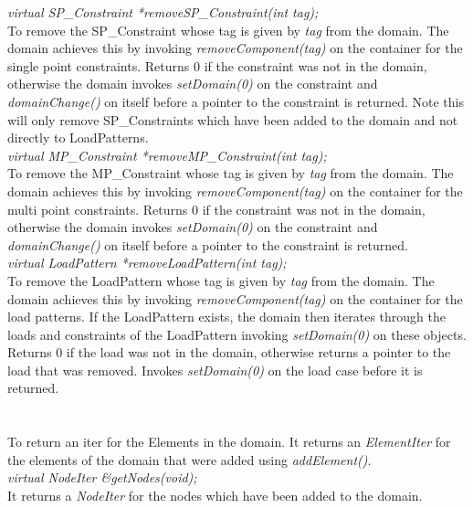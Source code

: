 {\em virtual SP\_Constraint *removeSP\_Constraint(int tag);}\\
To remove the SP\_Constraint whose tag is given by {\em tag} from the
domain. The domain achieves this by invoking {\em
removeComponent(tag)} on the container for the single point
constraints. Returns $0$ if the constraint was not in the domain,
otherwise the domain invokes {\em setDomain(0)} on the constraint and
{\em domainChange()} on itself before a pointer to the constraint is
returned. Note this will only remove SP\_Constraints which have been
added to the domain and not directly to LoadPatterns.\\

{\em virtual MP\_Constraint *removeMP\_Constraint(int tag);} \\
To remove the MP\_Constraint whose tag is given by {\em tag} from the
domain. The domain achieves this by invoking {\em
removeComponent(tag)} on the container for the multi point
constraints. Returns $0$ if the constraint was not in the domain,
otherwise the domain invokes {\em setDomain(0)} on the constraint and
{\em domainChange()} on itself before a pointer to the constraint is
returned.\\   

{\em virtual LoadPattern *removeLoadPattern(int tag);}\\         
To remove the LoadPattern whose tag is given by {\em tag} from the
domain. The domain achieves this by invoking {\em
removeComponent(tag)} on the container for the load patterns. 
If the LoadPattern exists, the domain then iterates through the loads
and constraints of the LoadPattern invoking {\em setDomain(0)} on
these objects. Returns
$0$ if the load was not in the domain, otherwise returns a pointer to
the load that was removed. Invokes {\em setDomain(0)} on the load case
before it is returned.\\ 


  \\
 \\
To return an iter for the Elements in the domain. It returns an {\em
ElementIter} for the elements of the domain that were added using {\em
addElement()}. \\  

{\em virtual NodeIter \&getNodes(void);} \\
It returns a {\em NodeIter} for the nodes which have been added to the
domain. \\ 

